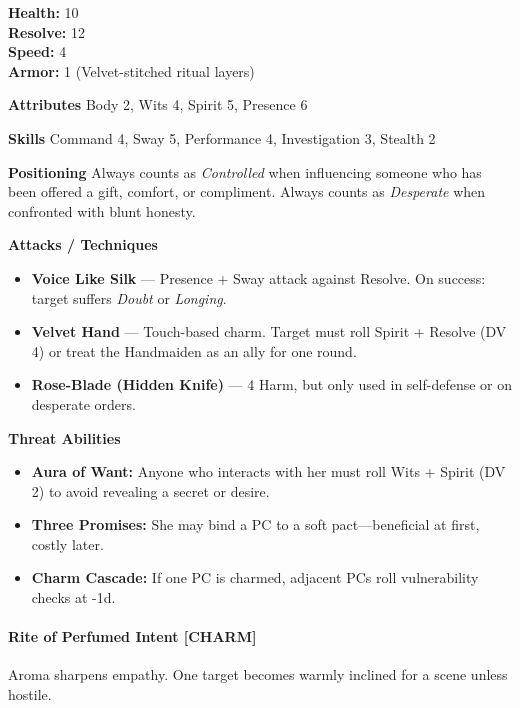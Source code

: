 \documentclass[11pt]{book}
\begin{document}

\begin{dungeonstats}
\textbf{Health:} 10 \\
\textbf{Resolve:} 12 \\
\textbf{Speed:} 4 \\
\textbf{Armor:} 1 (Velvet-stitched ritual layers) \\
\end{dungeonstats}

\textbf{Attributes}  
Body 2, Wits 4, Spirit 5, Presence 6

\textbf{Skills}  
Command 4, Sway 5, Performance 4, Investigation 3, Stealth 2

\textbf{Positioning}  
Always counts as \emph{Controlled} when influencing someone who has been offered a gift, comfort, or compliment.  
Always counts as \emph{Desperate} when confronted with blunt honesty.

\textbf{Attacks / Techniques}
\begin{itemize}[leftmargin=*]
    \item \textbf{Voice Like Silk} --- Presence + Sway attack against Resolve.  
    On success: target suffers \emph{Doubt} or \emph{Longing}.
    \item \textbf{Velvet Hand} --- Touch-based charm. Target must roll Spirit + Resolve (DV 4) or treat the Handmaiden as an ally for one round.
    \item \textbf{Rose-Blade (Hidden Knife)} --- 4 Harm, but only used in self-defense or on desperate orders.
\end{itemize}

\textbf{Threat Abilities}
\begin{itemize}[leftmargin=*]
    \item \textbf{Aura of Want:} Anyone who interacts with her must roll Wits + Spirit (DV 2) to avoid revealing a secret or desire.
    \item \textbf{Three Promises:} She may bind a PC to a soft pact---beneficial at first, costly later.
    \item \textbf{Charm Cascade:} If one PC is charmed, adjacent PCs roll vulnerability checks at -1d.
\end{itemize}

\paragraph{Rite of Perfumed Intent [CHARM]}
Aroma sharpens empathy.  
One target becomes warmly inclined for a scene unless hostile.
\end{document}
